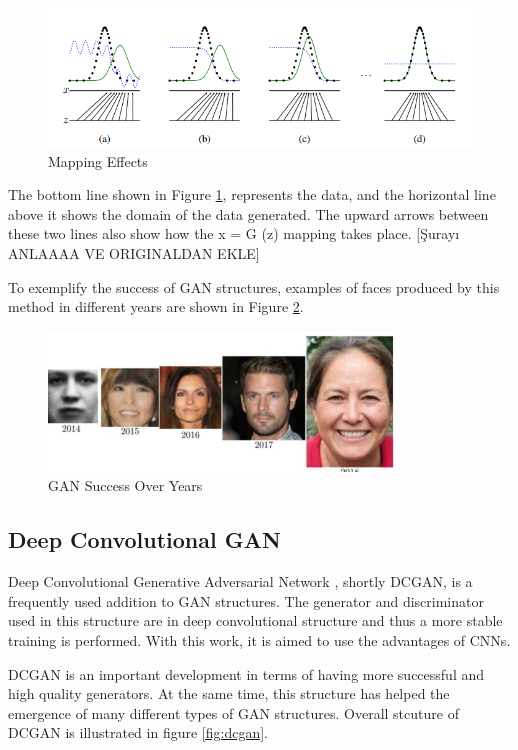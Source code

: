 \begin{figure}[h]
    \centering
    \includegraphics[scale=0.7]{figures/chapter3/gan-mapping.png}
    \caption{Mapping Effects}
    \label{fig:gan-mappingl}
\end{figure}

The bottom line shown in Figure \ref{fig:gan-mappingl}, represents the data, and the horizontal line above it shows the domain of the data generated. The upward arrows between these two lines also show how the x = G (z) mapping takes place. [Şurayı ANLAAAA VE ORIGINALDAN EKLE]

To exemplify the success of GAN structures, examples of faces produced by this method in different years are shown in Figure \ref{fig:gan-success}.

\begin{figure}[h]
    \centering
    \includegraphics{figures/chapter3/gan-success-over-years.png}
    \caption{GAN Success Over Years}
    \label{fig:gan-success}
\end{figure}

\subsection{Deep Convolutional GAN}

Deep Convolutional Generative Adversarial Network \cite{dcgan}, shortly DCGAN, is a frequently used addition to GAN structures. The generator and discriminator used in this structure are in deep convolutional structure and thus a more stable training is performed. With this work, it is aimed to use the advantages of CNNs.

DCGAN is an important development in terms of having more successful and high quality generators. At the same time, this structure has helped the emergence of many different types of GAN structures. Overall stcuture of DCGAN is illustrated in figure \ref{fig:dcgan}.

